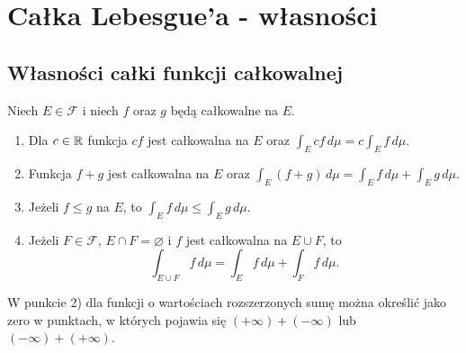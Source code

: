 \chapter{Całka Lebesgue'a - własności}
\label{chap:calka-lebesguea-wlasnosci}

\section{Własności całki funkcji całkowalnej}
\label{sec:wlasnosci-calki-funkcji-calkowalnej}

\begin{twierdzenie}
\label{tw:wlasnosci-calki-funkcji-calkowalnej}
Niech $E\in\mathcal F$ i niech $f$ oraz $g$ będą całkowalne na $E$.
\begin{enumerate}
  \item Dla $c\in\mathbb{R}$ funkcja $cf$ jest całkowalna na $E$ oraz
        $\displaystyle\int_E cf\,d\mu=c\int_E f\,d\mu$.
  \item Funkcja $f+g$ jest całkowalna na $E$ oraz
        $\displaystyle\int_E(f+g)\,d\mu=\int_E f\,d\mu+\int_E g\,d\mu$.
  \item Jeżeli $f\leq g$ na $E$, to
        $\displaystyle\int_E f\,d\mu\leq\int_E g\,d\mu$.
  \item Jeżeli $F\in\mathcal F$, $E\cap F=\varnothing$ i $f$ jest
        całkowalna na $E\cup F$, to
        \[
          \int_{E\cup F}f\,d\mu=\int_E f\,d\mu+\int_F f\,d\mu.
        \]
\end{enumerate}
W punkcie 2) dla funkcji o wartościach rozszerzonych sumę można
określić jako zero w punktach, w których pojawia się
$(+\infty)+(-\infty)$ lub $(-\infty)+(+\infty)$.
\end{twierdzenie}

